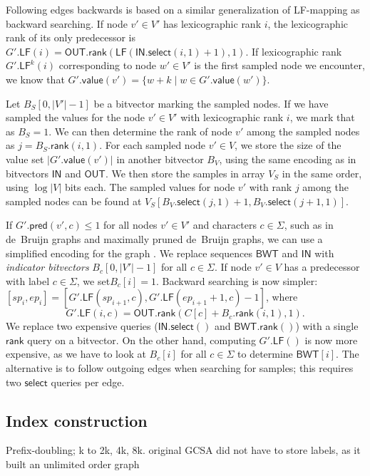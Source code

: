 \documentclass[a4paper,UKenglish]{lipics-v2016}
\newcommand{\set}[1]{\ensuremath{\{ #1 \}}}
\newcommand{\abs}[1]{\ensuremath{\lvert #1 \rvert}}
\newcommand{\rank}{\ensuremath{\mathsf{rank}}}
\newcommand{\select}{\ensuremath{\mathsf{select}}}
\newcommand{\LF}{\ensuremath{\mathsf{LF}}}
\newcommand{\gpred}{\ensuremath{\mathsf{pred}}}
\newcommand{\gvalue}{\ensuremath{\mathsf{value}}}
\newcommand{\LFmapping}{LF\nobreakdash-mapping}
\newcommand{\BWT}{\ensuremath{\mathsf{BWT}}}
\newcommand{\bvIN}{\ensuremath{\mathsf{IN}}}
\newcommand{\bvOUT}{\ensuremath{\mathsf{OUT}}}
\begin{document}
Following edges backwards is based on a similar generalization of \LFmapping{} as backward searching. If node $v' \in V'$ has lexicographic rank $i$, the lexicographic rank of its only predecessor is
$G'.\LF(i) = \bvOUT.\rank(\LF(\bvIN.\select(i, 1) + 1), 1)$. If lexicographic rank $G'.\LF^{k}(i)$ corresponding to node $w' \in V'$ is the first sampled node we encounter, we know that $G'.\gvalue(v') = \set{w+k \mid w \in G'.\gvalue(w')}$.

Let $B_{S}[0, \abs{V'}-1]$ be a bitvector marking the sampled nodes. If we have sampled the values for the node $v' \in V'$ with lexicographic rank $i$, we mark that as $B_{S} = 1$. We can then determine the rank of node $v'$ among the sampled nodes as $j = B_{S}.\rank(i, 1)$. For each sampled node $v' \in V$, we store the size of the value set $\abs{G'.\gvalue(v')}$ in another bitvector $B_{V}$, using the same encoding as in bitvectors $\bvIN$ and $\bvOUT$. We then store the samples in array $V_{S}$ in the same order, using $\log \abs{V}$ bits each. The sampled values for node $v'$ with rank $j$ among the sampled nodes can be found at $V_{S}[B_{V}.\select(j, 1) + 1, B_{V}.\select(j+1, 1)]$.

If $G'.\gpred(v', c) \le 1$ for all nodes $v' \in V'$ and characters $c \in \Sigma$, such as in de~Bruijn graphs and maximally pruned de~Bruijn graphs, we can use a simplified encoding for the graph \cite{Siren2014}. We replace sequences $\BWT$ and $\bvIN$ with \emph{indicator bitvectors} $B_{c}[0, \abs{V'}-1]$ for all $c \in \Sigma$. If node $v' \in V$ has a predecessor with label $c \in \Sigma$, we set$B_{c}[i] = 1$. Backward searching is now simpler: $[sp_{i}, ep_{i}] = [G'.\LF(sp_{i+1}, c), G'.\LF(ep_{i+1}+1, c) - 1]$, where
$$
G'.\LF(i, c) = \bvOUT.\rank(C[c] + B_{c}.\rank(i, 1), 1).
$$
We replace two expensive queries ($\bvIN.\select()$ and $\BWT.\rank()$) with a single $\rank$ query on a bitvector. On the other hand, computing $G'.\LF()$ is now more expensive, as we have to look at $B_{c}[i]$ for all $c \in \Sigma$ to determine $\BWT[i]$. The alternative is to follow outgoing edges when searching for samples; this requires two $\select$ queries per edge.

\subsection{Index construction}

Prefix-doubling; k to 2k, 4k, 8k. original GCSA did not have to store labels, as it built an unlimited order graph
\end{document}
